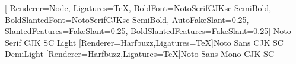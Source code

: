 %
%


\setlength\parindent{0pt}
\setlength\parindent{0pt}

\setlrmarginsandblock{3cm}{2cm}{*}
\checkandfixthelayout

\raggedbottom

\OnehalfSpacing

[
 Renderer=Node,
 Ligatures=TeX,
 BoldFont={NotoSerifCJKsc-SemiBold},
 BoldSlantedFont={NotoSerifCJKsc-SemiBold},
 AutoFakeSlant=0.25,
 SlantedFeatures={FakeSlant=0.25},
 BoldSlantedFeatures={FakeSlant=0.25}]
 {Noto Serif CJK SC Light}
[Renderer=Harfbuzz,Ligatures=TeX]{Noto Sans CJK SC DemiLight}
[Renderer=Harfbuzz,Ligatures=TeX]{Noto Sans Mono CJK SC}


\makeatletter
\renewcommand{\@pnumwidth}{2em} 
\renewcommand{\@tocrmarg}{4em}
\makeatother
\renewcommand\cftbeforechapterskip{5pt plus 1pt}

\setlength{\columnsep}{.8em}
\setlength{\columnseprule}{0.1mm}

\setheadfoot{14pt}{28pt}

\newcommand{\boxedsec}[1]
 {%
  \begin{tcolorbox}%
   [%
    colframe=black,%
    colback=black!5!white,%
    boxrule=2pt,%
    leftrule=2mm,%
    left=0mm,%
    right=0mm,%
    top=0mm,%
    bottom=0mm%
   ]
   \hfill\LARGE\bfseries#1
  \end{tcolorbox}
 }
\setsecheadstyle{\boxedsec}
\newcommand{\sectionbreak}{\phantomsection}

